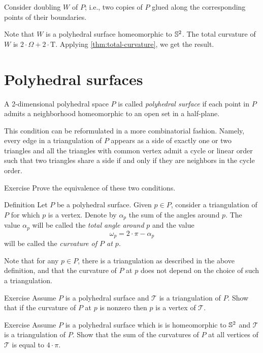 Consider doubling $W$ of $P$;
i.e., two copies of $P$ glued along the corresponding points of their  boundaries.

Note that $W$ is a polyhedral surface homeomorphic to $\mathbb{S}^2$.
The total curvature of $W$
is $2\cdot\Omega+2\cdot\mathrm{T}$.
Applying \ref{thm:total-curvature}, we get the result.
\qeds


\section{Polyhedral surfaces}

A 2-dimensional polyhedral space $P$
is called \emph{polyhedral surface}
if each point in $P$ admits a neighborhood homeomorphic to an open set in a half-plane.

This condition can be reformulated in a more combinatorial fashion.
Namely, every edge in a triangulation of $P$ appears as a side of exactly one or two triangles
and all the triangles with common vertex admit a cycle or linear order such that two triangles share a side if and only if they are neighbors in the cycle order. 

\begin{thm}{Exercise}\label{ex:mnfl-combi}
Prove the equivalence of these two conditions. 
\end{thm}


\begin{thm}{Definition}\label{def:curvature}
Let $P$ be a polyhedral surface.
Given $p\in P$, consider a triangulation of $P$ for which $p$ is a vertex.
Denote by $\alpha_p$ the sum of the angles around $p$.
The value
$\alpha_p$ will be called the \emph{total angle around} $p$
and the value
$$\omega_p = 2\cdot\pi - \alpha_p$$ 
will be  called the \emph{curvature of $P$ at $p$}.
\end{thm}

Note that for any $p\in P$, there is a triangulation as described in the above definition,
and that the curvature of $P$ at $p$ does not depend on the choice of such a triangulation.

\begin{thm}{Exercise}\label{ex:non0curv}
Assume $P$ is a polyhedral surface and $\mathcal{T}$ is a triangulation of $P$.
Show that if the curvature of $P$ at $p$ is nonzero then $p$ is a vertex of $\mathcal{T}$.
\end{thm}

\begin{thm}{Exercise}\label{ex:sum=2pi}
Assume $P$ is a polyhedral surface which is is homeomorphic to $\mathbb{S}^2$ 
and $\mathcal{T}$ is a triangulation of $P$.
Show that the sum of the curvatures of $P$ at all vertices of $\mathcal{T}$ is equal to $4\cdot\pi$.
\end{thm}



